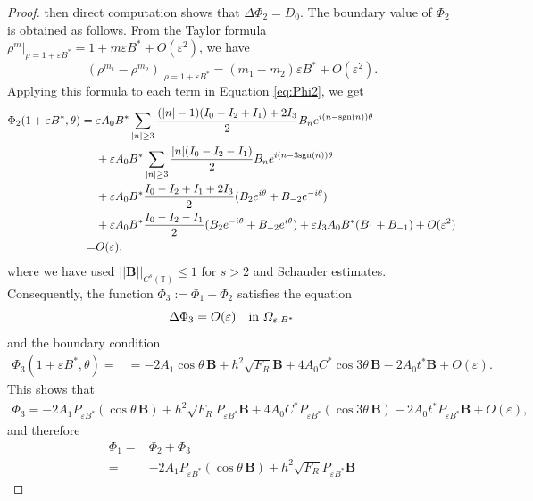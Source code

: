 \documentclass[12pt,reqno]{amsart}
\numberwithin{equation}{section}
\theoremstyle{definition}
\theoremstyle{remark}
\begin{document}
\begin{proof}
then direct computation shows that $  \Delta\Phi_2=D_0. $ 
 The boundary value of $\Phi_2$ is obtained as follows. From the Taylor formula $ \rho^m\big|_{\rho=1+\varepsilon B^*}=1+m\varepsilon B^*+O(\varepsilon^2) $, we have 
 \begin{equation*} 
 (\rho^{m_1}-\rho^{m_2})\big|_{\rho=1+\varepsilon B^*}
 =(m_1-m_2)\varepsilon B^*+O(\varepsilon^2).
 \end{equation*}
 Applying this formula to each term in Equation \eqref{eq:Phi2}, we get
 \begin{align*}\label{eq:Phi2-boundary-expanded}
 \Phi_2(1+\varepsilon B^*,\theta)={}&\varepsilon A_0B^*\sum_{|n|\ge3}
 \frac{(|n|-1)(I_0-I_2+I_1)+2I_3}{2}B_n e^{i(n-\text{sgn} (n))\theta}\notag\\
 &+\varepsilon A_0B^*\sum_{|n|\ge3}
 \frac{|n|(I_0-I_2-I_1)}{2}B_n e^{i(n-3\text{sgn} (n))\theta}\notag\\
 &+\varepsilon A_0B^*\frac{I_0-I_2+I_1+2I_3}{2}(B_2e^{i\theta}+B_{-2}e^{-i\theta}) \notag\\
 &+\varepsilon A_0B^*\frac{I_0-I_2-I_1}{2}(B_2e^{-i\theta}+B_{-2}e^{i\theta})
 +\varepsilon I_3A_0B^*(B_1+B_{-1})+O(\varepsilon^2)\\
 =&O(\varepsilon),
 \end{align*}
where we have used   $ ||\textbf{B}||_{C^s(\mathbb{T})}\leq 1 $ for $ s>2 $ and Schauder estimates.
Consequently, the function $ \Phi_3:=\Phi_1-\Phi_2 $ satisfies the equation
\begin{equation*} 
\Delta\Phi_3=O(\varepsilon)\quad\hbox{in }\varOmega_{\varepsilon,B^*}
\end{equation*} 
and the boundary condition
 \begin{align*} 
 \Phi_3(1+\varepsilon B^*,\theta)=&=-2A_1 \cos\theta\, \textbf{B}+h^2\sqrt{F_R} \textbf{B}+4 A_0C^*\cos3\theta\, \textbf{B}-2 A_0 t^*\textbf{B}+O(\varepsilon).
 \end{align*}
 This shows that
 \begin{align*}%
 \Phi_3=-2A_1P_{\varepsilon B^*}(\cos\theta\, \textbf{B})
 +h^2\sqrt{F_R}P_{\varepsilon B^*}  \textbf{B}
 +4A_0C^*P_{\varepsilon B^*}(\cos3\theta\, \textbf{B})-2A_0t^*P_{\varepsilon B^*} \textbf{B}+O(\varepsilon),
 \end{align*}
and therefore
\begin{equation*} 
\begin{split}
\Phi_1=&\Phi_2+\Phi_3\\
=&-2A_1P_{\varepsilon B^*}(\cos\theta\, \textbf{B})
+h^2\sqrt{F_R}P_{\varepsilon B^*}  \textbf{B}

\end{split}
\end{equation*}
\end{proof}
\end{document}
